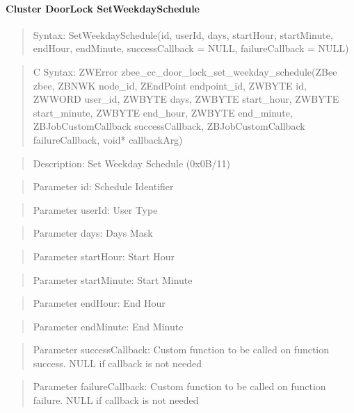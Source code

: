 \paragraph{Cluster DoorLock SetWeekdaySchedule}
\begin{quote}Syntax: SetWeekdaySchedule(id, userId, days, startHour, startMinute, endHour, endMinute, successCallback = NULL, failureCallback = NULL)\end{quote}
\begin{quote}C Syntax: ZWError zbee\_cc\_door\_lock\_set\_weekday\_schedule(ZBee zbee, ZBNWK node\_id, ZEndPoint endpoint\_id, ZWBYTE id, ZWWORD user\_id, ZWBYTE days, ZWBYTE start\_hour, ZWBYTE start\_minute, ZWBYTE end\_hour, ZWBYTE end\_minute, ZBJobCustomCallback successCallback, ZBJobCustomCallback failureCallback, void* callbackArg)\end{quote}
\begin{quote}Description: Set Weekday Schedule (0x0B/11)\end{quote}
\begin{quote}Parameter id: Schedule Identifier\end{quote}
\begin{quote}Parameter userId: User Type\end{quote}
\begin{quote}Parameter days: Days Mask\end{quote}
\begin{quote}Parameter startHour: Start Hour\end{quote}
\begin{quote}Parameter startMinute: Start Minute\end{quote}
\begin{quote}Parameter endHour: End Hour\end{quote}
\begin{quote}Parameter endMinute: End Minute\end{quote}
\begin{quote}Parameter successCallback: Custom function to be called on function success. NULL if callback is not needed\end{quote}
\begin{quote}Parameter failureCallback: Custom function to be called on function failure. NULL if callback is not needed\end{quote}



